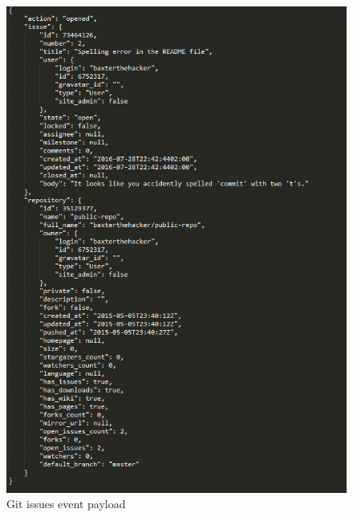 \documentclass[11pt,a4paper]{article}
\begin{document}
\begin{figure}[H]
	\centering
	\includegraphics[width=\linewidth]{../Images/gitissues}
	\caption{Git issues event payload}
\end{figure}
\end{document}
